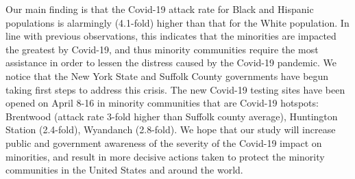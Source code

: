 \documentclass[twoside,12pt,onecolumn]{article}
\begin{document}
Our main finding is that the Covid-19 attack rate for Black and Hispanic populations is alarmingly (4.1-fold) higher than that for the White population. In line with previous observations, this indicates that the minorities are impacted the greatest by Covid-19, and thus minority communities require the most assistance in order to lessen the distress caused by the Covid-19 pandemic. We notice that the New York State and Suffolk County governments have begun taking first steps to address this crisis. The new Covid-19 testing sites have been opened on April 8-16  in minority communities that are Covid-19 hotspots: Brentwood (attack rate 3-fold higher than Suffolk county average), Huntington Station (2.4-fold), Wyandanch (2.8-fold). We hope that our study will increase public and government awareness of the severity of the Covid-19 impact on minorities, and result in more decisive actions taken to protect the minority communities in the United States and around the world.



\end{document}
